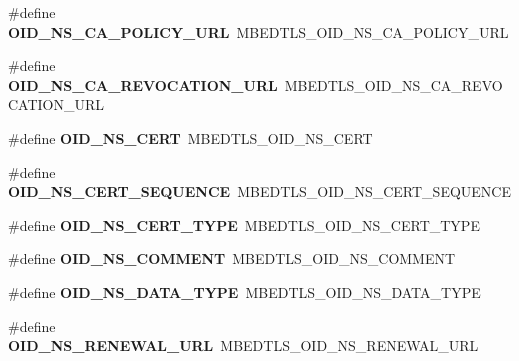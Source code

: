 \begin{DoxyCompactItemize}
\item 
\mbox{\label{compat-1_83_8h_a011c64b98f16e59f56cd49065ce1aee3}} 
\#define {\bfseries O\+I\+D\+\_\+\+N\+S\+\_\+\+C\+A\+\_\+\+P\+O\+L\+I\+C\+Y\+\_\+\+U\+RL}~M\+B\+E\+D\+T\+L\+S\+\_\+\+O\+I\+D\+\_\+\+N\+S\+\_\+\+C\+A\+\_\+\+P\+O\+L\+I\+C\+Y\+\_\+\+U\+RL
\item 
\mbox{\label{compat-1_83_8h_adad65916b0e7182080a7a439c1368cb0}} 
\#define {\bfseries O\+I\+D\+\_\+\+N\+S\+\_\+\+C\+A\+\_\+\+R\+E\+V\+O\+C\+A\+T\+I\+O\+N\+\_\+\+U\+RL}~M\+B\+E\+D\+T\+L\+S\+\_\+\+O\+I\+D\+\_\+\+N\+S\+\_\+\+C\+A\+\_\+\+R\+E\+V\+O\+C\+A\+T\+I\+O\+N\+\_\+\+U\+RL
\item 
\mbox{\label{compat-1_83_8h_ac8fb06c12b58f8c23fb9cee1a6583086}} 
\#define {\bfseries O\+I\+D\+\_\+\+N\+S\+\_\+\+C\+E\+RT}~M\+B\+E\+D\+T\+L\+S\+\_\+\+O\+I\+D\+\_\+\+N\+S\+\_\+\+C\+E\+RT
\item 
\mbox{\label{compat-1_83_8h_a6e11b6bd4f46654c9c302e314c738db0}} 
\#define {\bfseries O\+I\+D\+\_\+\+N\+S\+\_\+\+C\+E\+R\+T\+\_\+\+S\+E\+Q\+U\+E\+N\+CE}~M\+B\+E\+D\+T\+L\+S\+\_\+\+O\+I\+D\+\_\+\+N\+S\+\_\+\+C\+E\+R\+T\+\_\+\+S\+E\+Q\+U\+E\+N\+CE
\item 
\mbox{\label{compat-1_83_8h_a971f29a78ac0ac1dc488bf290426d494}} 
\#define {\bfseries O\+I\+D\+\_\+\+N\+S\+\_\+\+C\+E\+R\+T\+\_\+\+T\+Y\+PE}~M\+B\+E\+D\+T\+L\+S\+\_\+\+O\+I\+D\+\_\+\+N\+S\+\_\+\+C\+E\+R\+T\+\_\+\+T\+Y\+PE
\item 
\mbox{\label{compat-1_83_8h_ade01c6901220a5ddb39e22921c0f2700}} 
\#define {\bfseries O\+I\+D\+\_\+\+N\+S\+\_\+\+C\+O\+M\+M\+E\+NT}~M\+B\+E\+D\+T\+L\+S\+\_\+\+O\+I\+D\+\_\+\+N\+S\+\_\+\+C\+O\+M\+M\+E\+NT
\item 
\mbox{\label{compat-1_83_8h_aab1593aa6d2423be15638f0dd3c36ad1}} 
\#define {\bfseries O\+I\+D\+\_\+\+N\+S\+\_\+\+D\+A\+T\+A\+\_\+\+T\+Y\+PE}~M\+B\+E\+D\+T\+L\+S\+\_\+\+O\+I\+D\+\_\+\+N\+S\+\_\+\+D\+A\+T\+A\+\_\+\+T\+Y\+PE
\item 
\mbox{\label{compat-1_83_8h_a2d508479e3767beefe6eb8d6233b81d2}} 
\#define {\bfseries O\+I\+D\+\_\+\+N\+S\+\_\+\+R\+E\+N\+E\+W\+A\+L\+\_\+\+U\+RL}~M\+B\+E\+D\+T\+L\+S\+\_\+\+O\+I\+D\+\_\+\+N\+S\+\_\+\+R\+E\+N\+E\+W\+A\+L\+\_\+\+U\+RL

\end{DoxyCompactItemize}
